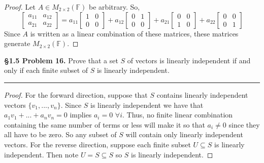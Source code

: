 \documentclass[leqno]{article}
\theoremstyle{nonumberplain}
\newtheorem{proof}{Proof}
\begin{document}
\begin{proof}
Let $A\in M_{2\times 2}(\mathbb{F})$ be arbitrary. So,
\[
\begin{bmatrix}
	a_{11} &	a_{12}\\
	a_{21} & a_{22}
\end{bmatrix}
=a_{11}
\begin{bmatrix}
	1 & 0 \\
	0 & 0 
\end{bmatrix}
+a_{12}\begin{bmatrix}
	0 & 1 \\
	0 & 0 
\end{bmatrix}
+a_{21}\begin{bmatrix}
	0 & 0 \\
	1 & 0 
\end{bmatrix} 
+a_{22}\begin{bmatrix}
	0 & 0 \\
	0 & 1 
\end{bmatrix}
\]
Since $A$ is written as a linear combination of these matrices, these matrices generate $M_{2\times 2}(\mathbb{F})$.
\end{proof}
\pagebreak




\noindent\textbf{\S 1.5 Problem 16.} Prove that a set $S$ of vectors is linearly independent if and only if each finite subset of $S$ is linearly independent.

\noindent\rule[0.5ex]{\linewidth}{1pt}

\begin{proof}
For the forward direction, suppose that $S$ contains linearly independent vectors $\{v_1,...,v_n\}$. Since $S$ is linearly independent we have that $a_1v_1+...+a_nv_n=0$ implies $a_i=0$ $\forall i$. Thus, no finite linear combination containing the same number of terms or less will make it so that $a_i\neq 0$ since they all have to be zero.  So any subset of $S$ will contain only linearly independent vectors. For the reverse direction, suppose each finite subset $U\subseteq S$ is linearly independent. Then note $U=S\subseteq S$ so $S$ is linearly independent.
\end{proof}
\pagebreak
\end{document}
